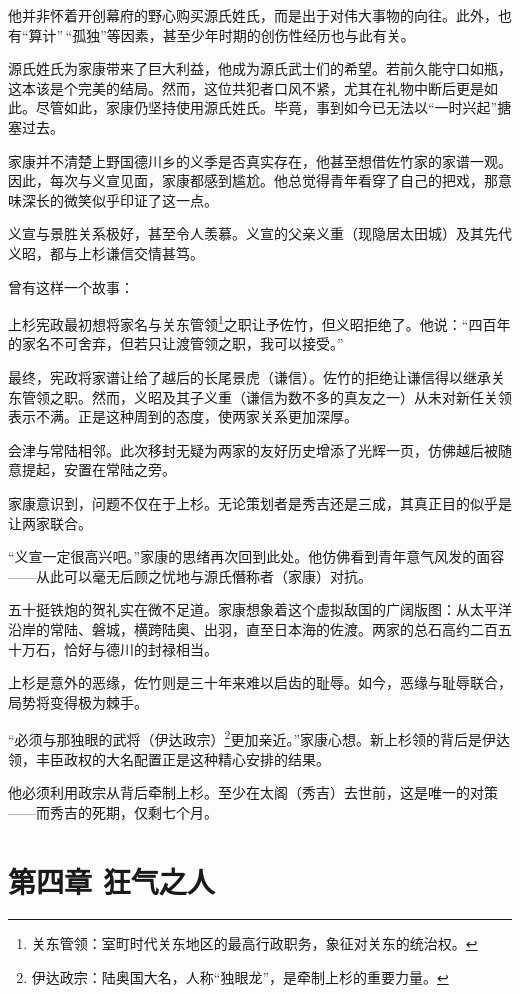 \documentclass[
]{article}
\begin{document}
他并非怀着开创幕府的野心购买源氏姓氏，而是出于对伟大事物的向往。此外，也有``算计''\,``孤独''等因素，甚至少年时期的创伤性经历也与此有关。

源氏姓氏为家康带来了巨大利益，他成为源氏武士们的希望。若前久能守口如瓶，这本该是个完美的结局。然而，这位共犯者口风不紧，尤其在礼物中断后更是如此。尽管如此，家康仍坚持使用源氏姓氏。毕竟，事到如今已无法以``一时兴起''搪塞过去。

家康并不清楚上野国德川乡的义季是否真实存在，他甚至想借佐竹家的家谱一观。因此，每次与义宣见面，家康都感到尴尬。他总觉得青年看穿了自己的把戏，那意味深长的微笑似乎印证了这一点。

义宣与景胜关系极好，甚至令人羡慕。义宣的父亲义重（现隐居太田城）及其先代义昭，都与上杉谦信交情甚笃。

曾有这样一个故事：

上杉宪政最初想将家名与关东管领\footnote{关东管领：室町时代关东地区的最高行政职务，象征对关东的统治权。}之职让予佐竹，但义昭拒绝了。他说：``四百年的家名不可舍弃，但若只让渡管领之职，我可以接受。''

最终，宪政将家谱让给了越后的长尾景虎（谦信）。佐竹的拒绝让谦信得以继承关东管领之职。然而，义昭及其子义重（谦信为数不多的真友之一）从未对新任关领表示不满。正是这种周到的态度，使两家关系更加深厚。

会津与常陆相邻。此次移封无疑为两家的友好历史增添了光辉一页，仿佛越后被随意提起，安置在常陆之旁。

家康意识到，问题不仅在于上杉。无论策划者是秀吉还是三成，其真正目的似乎是让两家联合。

``义宣一定很高兴吧。''家康的思绪再次回到此处。他仿佛看到青年意气风发的面容------从此可以毫无后顾之忧地与源氏僭称者（家康）对抗。

五十挺铁炮的贺礼实在微不足道。家康想象着这个虚拟敌国的广阔版图：从太平洋沿岸的常陆、磐城，横跨陆奥、出羽，直至日本海的佐渡。两家的总石高约二百五十万石，恰好与德川的封禄相当。

上杉是意外的恶缘，佐竹则是三十年来难以启齿的耻辱。如今，恶缘与耻辱联合，局势将变得极为棘手。

``必须与那独眼的武将（伊达政宗）\footnote{伊达政宗：陆奥国大名，人称``独眼龙''，是牵制上杉的重要力量。}更加亲近。''家康心想。新上杉领的背后是伊达领，丰臣政权的大名配置正是这种精心安排的结果。

他必须利用政宗从背后牵制上杉。至少在太阁（秀吉）去世前，这是唯一的对策------而秀吉的死期，仅剩七个月。

\section*{第四章 狂气之人}\label{ux7b2cux56dbux7ae0-ux72c2ux6c14ux4e4bux4eba}
\end{document}
